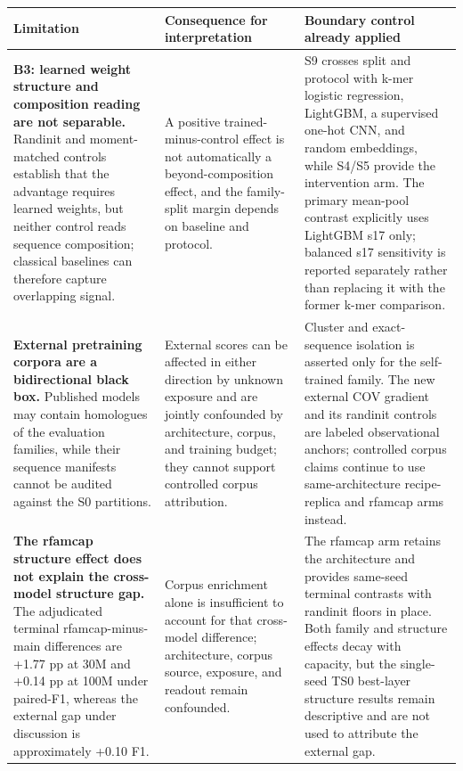 \begin{longtable}[]{@{}
  >{\raggedright\arraybackslash}p{}
  >{\raggedright\arraybackslash}p{}
  >{\raggedright\arraybackslash}p{}@{}}
\toprule
Limitation & Consequence for interpretation & Boundary control already applied \\
\midrule
\endhead
\textbf{B3: learned weight structure and composition reading are not separable.} Randinit and moment-matched controls establish that the advantage requires learned weights, but neither control reads sequence composition; classical baselines can therefore capture overlapping signal. & A positive trained-minus-control effect is not automatically a beyond-composition effect, and the family-split margin depends on baseline and protocol. & S9 crosses split and protocol with k-mer logistic regression, LightGBM, a supervised one-hot CNN, and random embeddings, while S4/S5 provide the intervention arm. The primary mean-pool contrast explicitly uses LightGBM s17 only; balanced s17 sensitivity is reported separately rather than replacing it with the former k-mer comparison. \\
\textbf{External pretraining corpora are a bidirectional black box.} Published models may contain homologues of the evaluation families, while their sequence manifests cannot be audited against the S0 partitions. & External scores can be affected in either direction by unknown exposure and are jointly confounded by architecture, corpus, and training budget; they cannot support controlled corpus attribution. & Cluster and exact-sequence isolation is asserted only for the self-trained family. The new external COV gradient and its randinit controls are labeled observational anchors; controlled corpus claims continue to use same-architecture recipe-replica and rfamcap arms instead. \\
\textbf{The rfamcap structure effect does not explain the cross-model structure gap.} The adjudicated terminal rfamcap-minus-main differences are +1.77 pp at 30M and +0.14 pp at 100M under paired-F1, whereas the external gap under discussion is approximately +0.10 F1. & Corpus enrichment alone is insufficient to account for that cross-model difference; architecture, corpus source, exposure, and readout remain confounded. & The rfamcap arm retains the architecture and provides same-seed terminal contrasts with randinit floors in place. Both family and structure effects decay with capacity, but the single-seed TS0 best-layer structure results remain descriptive and are not used to attribute the external gap. \\

\end{longtable}

